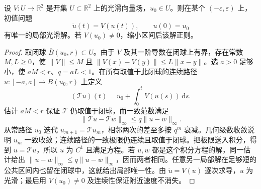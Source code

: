 \begin{lemma}\label{g1:lem:surface-field-integral-curve}
	设 \(V:U\to\mathbb R^2\) 是开集 \(U\subset\mathbb R^2\) 上的光滑向量场，\(u_0\in U\)。则在某个 \((-\varepsilon,\varepsilon)\) 上，初值问题
	\[
		\dot u(t)=V(u(t)),\qquad u(0)=u_0
	\]
	有唯一的局部光滑解。若 \(V(u_0)\ne0\)，缩小区间后该解正则。
\end{lemma}
\begin{proof}
	取闭球 \(\overline B(u_0,r)\subset U\)。由于 \(V\) 及其一阶导数在闭球上有界，存在常数 \(M,L\ge0\)，使 \(\lVert V\rVert\le M\) 且 \(\lVert V(x)-V(y)\rVert\le L\lVert x-y\rVert\)。选 \(a>0\) 足够小，使 \(aM<r\)、\(q=aL<1\)。在所有取值于此闭球的连续路径 \(u:[-a,a]\to\overline B(u_0,r)\) 上定义
	\[
		(\mathcal Tu)(t)=u_0+\int_0^t V(u(s))\,\mathrm ds.
	\]
	估计 \(aM<r\) 保证 \(\mathcal T\) 仍取值于闭球，而一致范数满足
	\[
		\lVert\mathcal Tu-\mathcal Tw\rVert_\infty\le q\lVert u-w\rVert_\infty.
	\]
	从常路径 \(u_0\) 迭代 \(u_{m+1}=\mathcal Tu_m\)，相邻两次的差至多按 \(q^m\) 衰减。几何级数收敛说明 \(u_m\) 一致收敛；连续路径的一致极限仍连续且取值于闭球。把极限送入积分，得到 \(u=\mathcal Tu\)，所以 \(u\) 为 \(C^1\) 且满足方程。若 \(u,w\) 都是这个积分方程的解，同一估计给出 \(\lVert u-w\rVert_\infty\le q\lVert u-w\rVert_\infty\)，因而两者相同。任意另一局部解在足够短的公共区间内也留在闭球中，这就给出局部唯一性。由 \(\dot u=V(u)\) 逐次求导，\(u\) 为光滑；最后用 \(V(u_0)\ne0\) 及连续性保证附近速度不消失。
\end{proof}


